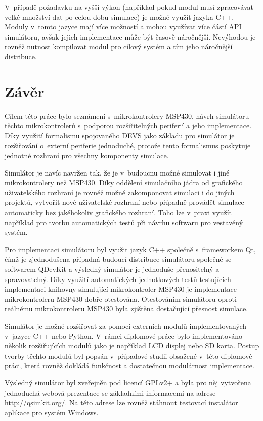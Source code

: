 V~případě požadavku na vyšší výkon (například pokud modul musí zpracovávat velké množství dat po celou dobu simulace) je možné využít jazyka C++. Moduly v~tomto jazyce mají více možností a mohou využívat více částí API simulátoru, avšak jejich implementace může být časově náročnější. Nevýhodou je rovněž nutnost kompilovat modul pro cílový systém a tím jeho náročnější distribuce.


\chapter{Závěr}

Cílem této práce bylo seznámení s~mikrokontrolery MSP430, návrh simulátoru těchto mikrokontrolerů s~podporou rozšiřitelných periferií a jeho implementace. Díky využití formalismu spojovaného DEVS jako základu pro simulátor je rozšiřování o~externí periferie jednoduché, protože tento formalismus poskytuje jednotné rozhraní pro všechny komponenty simulace.

Simulátor je navíc navržen tak, že je v~budoucnu možné simulovat i jiné mikrokontrolery než MSP430. Díky oddělení simulačního jádra od grafického uživatelského rozhraní je rovněž možné zakomponovat simulaci i do jiných projektů, vytvořit nové uživatelské rozhraní nebo případně provádět simulace automaticky bez jakéhokoliv grafického rozhraní. Toho lze v~praxi využít například pro tvorbu automatických testů při návrhu softwaru pro vestavěný systém.

Pro implementaci simulátoru byl využit jazyk C++ společně s~frameworkem Qt, čímž je zjednodušena případná budoucí distribuce simulátoru společně se softwarem QDevKit a výsledný simulátor je jednoduše přenositelný a spravovatelný. Díky využití automatických jednotkových testů testujících implementaci knihovny simulující mikrokontroler MSP430 je implementace mikrokontroleru MSP430 dobře otestována. Otestováním simulátoru oproti reálnému mikrokontroleru MSP430 byla zjištěna dostačující přesnost simulace.

Simulátor je možné rozšiřovat za pomocí externích modulů implementovaných v~jazyce C++ nebo Python. V~rámci diplomové práce bylo implementováno několik rozšiřujících modulů jako je například LCD displej nebo SD karta. Postup tvorby těchto modulů byl popsán v~případové studii obsažené v~této diplomové práci, která rovněž dokládá funkčnost a dostatečnou modulárnost implementace.

Výsledný simulátor byl zveřejněn pod licencí GPLv2+ a byla pro něj vytvořena jednoduchá webová prezentace se základními informacemi na adrese \url{http://qsimkit.org/}. Na této adrese lze rovněž stáhnout testovací instalátor aplikace pro systém Windows.

